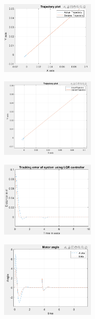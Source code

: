 \documentclass[conference]{IEEEtran}
\begin{document}
\begin{figure}[htbp]
\centerline{\includegraphics[width=0.4\textwidth]{FPTLQR.png}}
\caption{}
\label{fig}
\end{figure}
\begin{figure}[htbp]
\centerline{\includegraphics[width=0.4\textwidth]{DRFPTLQR.png}}
\caption{}
\label{fig}
\end{figure}
\begin{figure}[htbp]
\centerline{\includegraphics[width=0.4\textwidth]{DRFPTELQR.png}}
\caption{}
\label{fig}
\end{figure}
\begin{figure}[htbp]
\centerline{\includegraphics[width=0.4\textwidth]{DRFPPALQR.png}}
\caption{}
\label{fig}
\end{figure}
\end{document}
